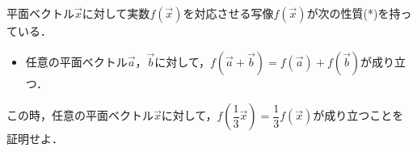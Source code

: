 \documentclass[../../main.tex]{subfiles}
\begin{document}
平面ベクトル$\vec{x}$に対して実数$f(\vec{x})$を対応させる写像$f(\vec{x})$が次の性質(*)を持っている．
\begin{itemize}
  \item[(*)] 任意の平面ベクトル$\vec{a}$，$\vec{b}$に対して，$f(\vec{a}+\vec{b})=f(\vec{a})+f(\vec{b})$が成り立つ．
\end{itemize}
この時，任意の平面ベクトル$\vec{x}$に対して，$f\left(\dfrac{1}{3}\vec{x}\right)=\dfrac{1}{3}f(\vec{x})$が成り立つことを証明せよ．
\end{document}
